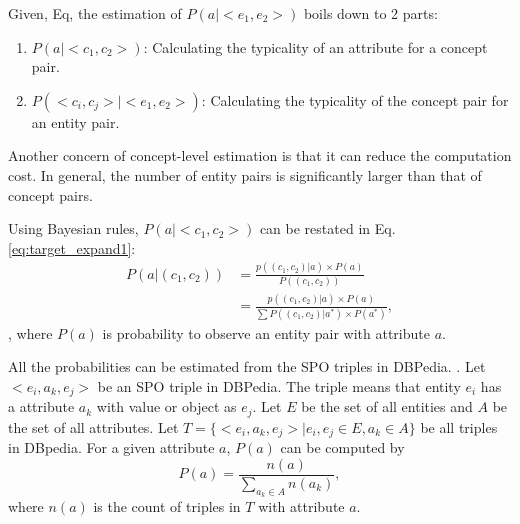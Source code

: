 Given, Eq, the estimation of $P(a|<e_1,e_2>)$ boils down to 2 parts: 
\begin{enumerate}
\item $P(a|<c_{1},c_{2}>)$: Calculating the typicality of an attribute for a concept pair.
\item $P(<c_{i},c_{j}>|<e_{1},e_{2}>)$: Calculating the typicality of the concept pair for an entity pair.
 
\end{enumerate}


Another concern of concept-level estimation is that it can reduce the computation cost. In general, the number of entity pairs is significantly larger than that of concept pairs. 

Using Bayesian rules, $P(a|<c_{1},c_{2}>)$ can be restated in Eq.\ref{eq:target_expand1}:
\begin{equation}
\label{eq:target_expand1}
\begin{split}
P(a|(c_{1},c_{2})) &= \frac{ p((c_{1},c_{2})|a)\times P(a) }{ P( (c_{1},c_{2}) ) }\\
&=\frac{ p((c_{1},c_{2})|a)\times P(a) }{ \sum{P( (c_{1},c_{2})|a^* )\times P(a^*)   } },
\end{split}
\end{equation}, 
where $P(a)$ is probability to observe an entity pair with attribute $a$. 

All the probabilities can be estimated from the SPO triples in DBPedia.
. Let $<e_i, a_k, e_j>$ be an SPO triple in DBPedia.
The triple means that entity $e_i$ has a attribute $a_k$ with value or object as $e_j$.  Let $E$ be the set of all entities and $A$
be the set of all attributes. Let $T=\{<e_i, a_k, e_j>|e_i,e_j\in E, a_k\in A\}$ be all triples in DBpedia. For a given attribute $a$, $P(a)$ can be computed by
\begin{equation}
\label{eq:pa}
P(a)=\frac{n(a)}{\sum_{a_k\in A}{n(a_k)}},
\end{equation}
where $n(a)$ is the count of triples in $T$ with attribute $a$.

